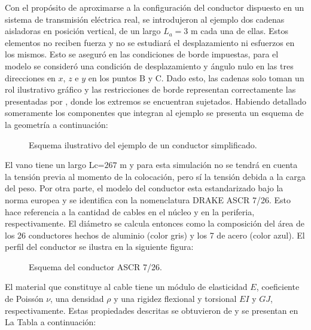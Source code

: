 Con el propósito de aproximarse a la configuración del conductor dispuesto en un sistema de transmisión eléctrica real, se introdujeron al ejemplo dos cadenas aisladoras en posición vertical, de un largo $L_a=3$ m cada una de ellas. Estos elementos no reciben fuerza y no se estudiará el desplazamiento ni esfuerzos en los mismos. Esto se aseguró en las condiciones de borde impuestas, para el modelo se consideró una condición de desplazamiento y ángulo nulo en las tres direcciones en $x$, $z$ e $y$ en los puntos $\text{B}$ y $\text{C}$. Dado esto, las cadenas solo toman un rol ilustrativo gráfico y las restricciones de borde representan correctamente las presentadas por \cite{foti2018finite}, donde los extremos se encuentran sujetados. Habiendo detallado someramente los componentes que integran al ejemplo se presenta un esquema de la geometría a continuación:

\begin{figure}[htbp]
	\centering
	\def\svgwidth{80mm}
	
	\caption{Esquema ilustrativo del ejemplo de un conductor simplificado.}
	\label{fig:RN:FotiCable:Ilustracion}
\end{figure}


El vano tiene un largo Lc=$267$ m y para esta simulación no se tendrá en cuenta la tensión previa al momento de la colocación, pero sí la tensión debida a la carga del peso. Por otra parte, el modelo del conductor esta estandarizado bajo la norma europea \citep{IEC60826} y se identifica con la nomenclatura DRAKE ASCR 7/26. Esto hace referencia a la cantidad de cables en el núcleo y en la periferia, respectivamente. El diámetro se calcula entonces como la composición del área de los 26 conductores hechos de aluminio (color gris) y los 7 de acero (color azul). El perfil del conductor se ilustra en la siguiente figura: 

\begin{figure}[htbp]
	\centering
	\def\svgwidth{80mm}
	
	\caption{Esquema del conductor  ASCR 7/26.}
	\label{fig:RN:FotiCable:Perfil}
\end{figure}
El material que constituye al cable tiene un módulo de elasticidad $E$, coeficiente de Poissón $\nu$, una densidad $\rho$ y una rigidez flexional y torsional $EI$ y $GJ$, respectivamente. Estas propiedades descritas se obtuvieron de \citep{Foti2016} y se presentan en La Tabla a continuación:

